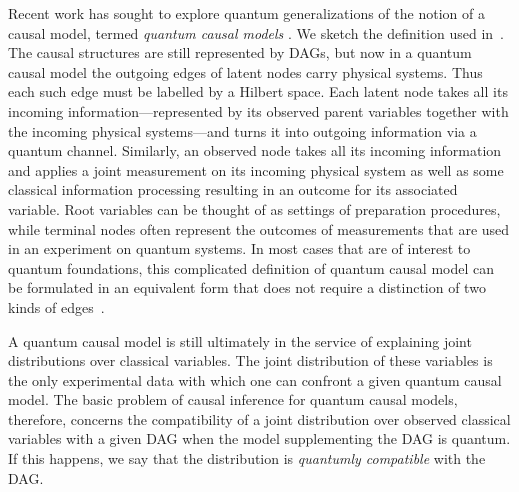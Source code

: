 {%

Recent work has sought to explore quantum generalizations of the notion of a causal model, termed {\em quantum causal models} \cite{leifer2013conditionalstates,pusey2014gdag,BeyondBellII,Chaves2015infoquantum,ried2015quantum}. We sketch the definition used in~\cite{pusey2014gdag}.
The causal structures are still represented by DAGs, but now in a quantum causal model the outgoing edges of latent nodes carry physical systems. Thus each such edge must be labelled by a Hilbert space. Each latent node takes all its incoming information---represented by its observed parent variables together with the incoming physical systems---and turns it into outgoing information via a quantum channel. Similarly, an observed node takes all its incoming information and applies a joint measurement on its incoming physical system as well as some classical information processing resulting in an outcome for its associated variable. Root variables can be thought of as settings of preparation procedures, while terminal nodes often represent the outcomes of measurements that are used in an experiment on quantum systems. In most cases that are of interest to quantum foundations, this complicated definition of quantum causal model can be formulated in an equivalent form that does not require a distinction of two kinds of edges~\cite{BeyondBellII}.

A quantum causal model is still ultimately in the service of explaining joint distributions over classical variables. The joint distribution of these variables is the only experimental data with which one can confront a given quantum causal model. The basic problem of causal inference for quantum causal models, therefore, concerns the compatibility of a joint distribution over observed classical variables with a given DAG when the model supplementing the DAG is quantum. If this happens, we say that the distribution is {\em quantumly compatible} with the DAG.  
 

}
